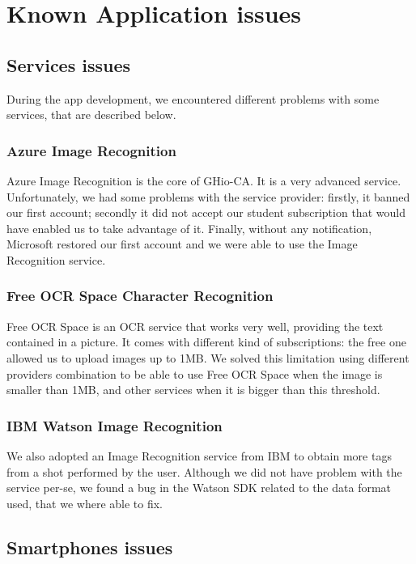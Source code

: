 \section{Known Application issues}
\label{sec:issues}

\subsection{Services issues}

During the app development, we encountered different problems with some services, 
that are described below.

\subsubsection{Azure Image Recognition}

Azure Image Recognition is the core of GHio-CA. It is a very advanced service. 
Unfortunately, we had some problems with the service provider: firstly, it 
banned our first account; secondly it did not accept our student subscription 
that would have enabled us to take advantage of it. Finally, without any 
notification, Microsoft restored our first account and we were able to use the 
Image Recognition service.

\subsubsection{Free OCR Space Character Recognition}

Free OCR Space is an OCR service that works very well, providing the text 
contained in a picture. It comes with different kind of subscriptions: the free 
one allowed us to upload images up to 1MB. We solved this limitation using 
different providers combination to be able to use Free OCR Space when the image 
is smaller than 1MB, and other services when it is bigger than this threshold.

\subsubsection{IBM Watson Image Recognition}

We also adopted an Image Recognition service from IBM to obtain more 
tags from a shot performed by the user. Although we did not have problem with 
the service per-se, we found a bug in the Watson SDK related to the data format 
used, that we where able to fix.

\subsection{Smartphones issues}


